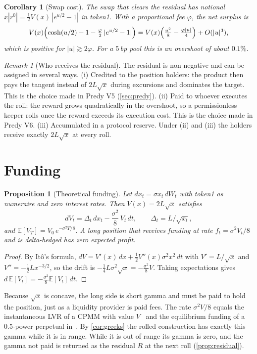 \documentclass[11pt]{article}
\newtheorem{proposition}{Proposition}
\newtheorem{corollary}{Corollary}
\theoremstyle{definition}
\theoremstyle{remark}
\newtheorem{remark}{Remark}
\begin{document}
\begin{corollary}[Swap cost]\label{cor:cost}
The swap that clears the residual has notional $x|r^0| = \tfrac{1}{2}V(x)\,|e^{u/2}-1|$ in token1. With a proportional fee $\varphi$, the net surplus is
\[
  V(x)\Bigl(\cosh(u/2)-1-\tfrac{\varphi}{2}\,|e^{u/2}-1|\Bigr)
  = V(x)\Bigl(\tfrac{u^2}{8}-\tfrac{\varphi|u|}{4}\Bigr)+O(|u|^3),
\]
which is positive for $|u|\gtrsim 2\varphi$. For a $5$\,bp pool this is an overshoot of about $0.1\%$.
\end{corollary}

\begin{remark}[Who receives the residual]\label{rem:allocation}
The residual is non-negative and can be assigned in several ways. (i) Credited to the position holders: the product then pays the tangent instead of $2L\sqrt{x}$ during excursions and dominates the target. This is the choice made in Predy V5 (\cref{sec:predy}). (ii) Paid to whoever executes the roll: the reward grows quadratically in the overshoot, so a permissionless keeper rolls once the reward exceeds its execution cost. This is the choice made in Predy V6. (iii) Accumulated in a protocol reserve. Under (ii) and (iii) the holders receive exactly $2L\sqrt{x}$ at every roll.
\end{remark}

\section{Funding}\label{sec:funding}

\begin{proposition}[Theoretical funding]\label{prop:funding}
Let $dx_t=\sigma x_t\,dW_t$ with token1 as numeraire and zero interest rates. Then $V(x)=2L\sqrt{x}$ satisfies
\[
  dV_t = \Delta_t\,dx_t - \frac{\sigma^2}{8}\,V_t\,dt,\qquad \Delta_t=L/\sqrt{x_t},
\]
and $\mathbb{E}[V_T]=V_0\,e^{-\sigma^2T/8}$. A long position that receives funding at rate $f_t=\sigma^2V_t/8$ and is delta-hedged has zero expected profit.
\end{proposition}

\begin{proof}
By It\^o's formula, $dV = V'(x)\,dx + \tfrac12 V''(x)\sigma^2x^2\,dt$ with $V'=L/\sqrt{x}$ and $V''=-\tfrac12 Lx^{-3/2}$, so the drift is $-\tfrac14 L\sigma^2\sqrt{x}=-\tfrac{\sigma^2}{8}V$. Taking expectations gives $d\,\mathbb{E}[V_t]=-\tfrac{\sigma^2}{8}\mathbb{E}[V_t]\,dt$.
\end{proof}

Because $\sqrt{x}$ is concave, the long side is short gamma and must be paid to hold the position, just as a liquidity provider is paid fees. The rate $\sigma^2V/8$ equals the instantaneous LVR of a CPMM with value $V$~\cite{milionis2022lvr} and the equilibrium funding of a $0.5$-power perpetual in~\cite{robinson2024perp}. By \cref{cor:greeks} the rolled construction has exactly this gamma while it is in range. While it is out of range its gamma is zero, and the gamma not paid is returned as the residual $R$ at the next roll (\cref{prop:residual}).
\end{document}
